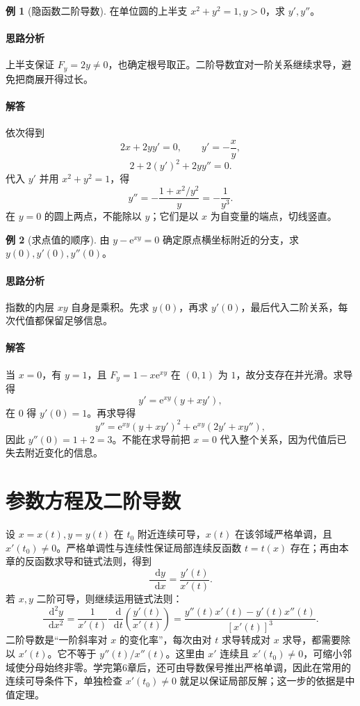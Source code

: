 \documentclass[UTF8,fontset=fandol,12pt,oneside,openany]{ctexrep}
\newcommand{\dd}{\mathop{}\!\mathrm d}
\newcommand{\ee}{\mathrm e}
\theoremstyle{definition}
\newtheorem{example}{例}[chapter]
\begin{document}
\begin{example}[隐函数二阶导数]
在单位圆的上半支 $x^2+y^2=1,y>0$，求 $y',y''$。
\end{example}
\paragraph{思路分析}上半支保证 $F_y=2y\ne0$，也确定根号取正。二阶导数宜对一阶关系继续求导，避免把商展开得过长。
\paragraph{解答}依次得到
\[
 2x+2yy'=0,\qquad y'=-\frac xy,
\]
\[
 2+2(y')^2+2yy''=0.
\]
代入 $y'$ 并用 $x^2+y^2=1$，得
\[
 y''=-\frac{1+x^2/y^2}y=-\frac1{y^3}.
\]
在 $y=0$ 的圆上两点，不能除以 $y$；它们是以 $x$ 为自变量的端点，切线竖直。

\begin{example}[求点值的顺序]
由 $y-\ee^{xy}=0$ 确定原点横坐标附近的分支，求 $y(0),y'(0),y''(0)$。
\end{example}
\paragraph{思路分析}指数的内层 $xy$ 自身是乘积。先求 $y(0)$，再求 $y'(0)$，最后代入二阶关系，每次代值都保留足够信息。
\paragraph{解答}当 $x=0$，有 $y=1$，且 $F_y=1-x\ee^{xy}$ 在 $(0,1)$ 为 $1$，故分支存在并光滑。求导得
\[
 y'=\ee^{xy}(y+xy'),
\]
在 $0$ 得 $y'(0)=1$。再求导得
\[
 y''=\ee^{xy}(y+xy')^2+\ee^{xy}(2y'+xy''),
\]
因此 $y''(0)=1+2=3$。不能在求导前把 $x=0$ 代入整个关系，因为代值后已失去附近变化的信息。

\section{参数方程及二阶导数}
\label{lec:05:parametric}

设 $x=x(t),y=y(t)$ 在 $t_0$ 附近连续可导，$x(t)$ 在该邻域严格单调，且 $x'(t_0)\ne0$。严格单调性与连续性保证局部连续反函数 $t=t(x)$ 存在；再由本章的反函数求导和链式法则，得到
\[
 \frac{\dd y}{\dd x}=\frac{y'(t)}{x'(t)}.
\]
若 $x,y$ 二阶可导，则继续运用链式法则：
\[
 \frac{\dd^2y}{\dd x^2}
 =\frac1{x'(t)}\frac{\dd}{\dd t}\left(\frac{y'(t)}{x'(t)}\right)
 =\frac{y''(t)x'(t)-y'(t)x''(t)}{[x'(t)]^3}.
\]
二阶导数是“一阶斜率对 $x$ 的变化率”，每次由对 $t$ 求导转成对 $x$ 求导，都需要除以 $x'(t)$。它不等于 $y''(t)/x''(t)$。这里由 $x'$ 连续且 $x'(t_0)\ne0$，可缩小邻域使分母始终非零。学完第6章后，还可由导数保号推出严格单调，因此在常用的连续可导条件下，单独检查 $x'(t_0)\ne0$ 就足以保证局部反解；这一步的依据是中值定理。
\end{document}
